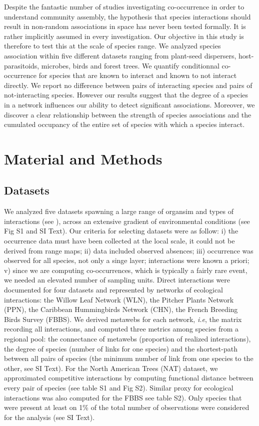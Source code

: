 Despite the fantastic number of studies investigating co-occurrence in
order to understand community assembly, the hypothesis that species
interactions should result in non-random associations in space has never
been tested formally. It is rather implicitly assumed in every
investigation. Our objective in this study is therefore to test this at
the scale of species range. We analyzed species association within five
different datasets ranging from plant-seed dispersers, host-parasitoids,
microbes, birds and forest trees. We quantify conditionnal co-occurrence
for species that are known to interact and known to not interact
directly. We report no difference between pairs of interacting species
and pairs of not-interacting species. However our results suggest that
the degree of a species in a network influences our ability to detect
significant associations. Moreover, we discover a clear relationship
between the strength of species associations and the cumulated occupancy
of the entire set of species with which a species interact.

\section{Material and Methods}\label{material-and-methods}

\subsection{Datasets}\label{datasets}

We analyzed five datasets spawning a large range of organsim and types
of interactions (see \citet{tbl:id}), across an extensive gradient of
environmental conditions (see Fig S1 and SI Text). Our criteria for
selecting datasets were as follow: i) the occurrence data must have been
collected at the local scale, it could not be derived from range maps;
ii) data included observed absences; iii) occurrence was observed for
all species, not only a singe layer; interactions were known a priori;
v) since we are computing co-occurrences, which is typically a fairly
rare event, we needed an elevated number of sampling units. Direct
interactions were documented for four datasets and represented by
networks of ecological interactions: the Willow Leaf Network (WLN), the
Pitcher Plants Network (PPN), the Caribbean Hummingbirds Network (CHN),
the French Breeding Birds Survey (FBBS). We derived metawebs for each
network, \emph{i.e}, the matrix recording all interactions, and computed
three metrics among species from a regional pool: the connectance of
metawebs (proportion of realized interactions), the degree of species
(number of links for one species) and the shortest-path between all
pairs of species (the minimum number of link from one species to the
other, see SI Text). For the North American Trees (NAT) dataset, we
approximated competitive interactions by computing functional distance
between every pair of species (see table S1 and Fig S2). Similar proxy
for ecological interactions was also computed for the FBBS see table
S2). Only species that were present at least on 1\% of the total number
of observations were considered for the analysis (see SI Text).

